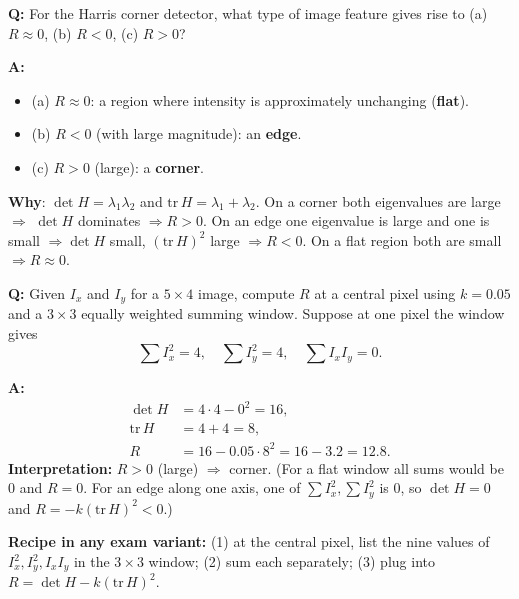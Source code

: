 \begin{exbox}
\textbf{Q:} For the Harris corner detector, what type of image feature gives rise to (a) $R \approx 0$, (b) $R < 0$, (c) $R > 0$?

\textbf{A:}
\begin{itemize}
  \item (a) $R \approx 0$: a region where intensity is approximately unchanging (\textbf{flat}).
  \item (b) $R < 0$ (with large magnitude): an \textbf{edge}.
  \item (c) $R > 0$ (large): a \textbf{corner}.
\end{itemize}
\textbf{Why}: $\det H = \lambda_1 \lambda_2$ and $\mathrm{tr}\, H = \lambda_1 + \lambda_2$. On a corner both eigenvalues are large $\Rightarrow$ $\det H$ dominates $\Rightarrow R > 0$. On an edge one eigenvalue is large and one is small $\Rightarrow \det H$ small, $(\mathrm{tr}\, H)^2$ large $\Rightarrow R < 0$. On a flat region both are small $\Rightarrow R \approx 0$.
\end{exbox}

\begin{exbox}
\textbf{Q:} Given $I_x$ and $I_y$ for a $5\times 4$ image, compute $R$ at a central pixel using $k=0.05$ and a $3\times 3$ equally weighted summing window. Suppose at one pixel the window gives
\[
\sum I_x^2 = 4, \quad \sum I_y^2 = 4, \quad \sum I_x I_y = 0.
\]

\textbf{A:}
\begin{align*}
\det H &= 4\cdot 4 - 0^2 = 16, \\
\mathrm{tr}\, H &= 4 + 4 = 8, \\
R &= 16 - 0.05 \cdot 8^2 = 16 - 3.2 = 12.8.
\end{align*}
\textbf{Interpretation:} $R > 0$ (large) $\Rightarrow$ corner. (For a flat window all sums would be 0 and $R = 0$. For an edge along one axis, one of $\sum I_x^2, \sum I_y^2$ is 0, so $\det H = 0$ and $R = -k(\mathrm{tr}\, H)^2 < 0$.)

\textbf{Recipe in any exam variant:}
(1) at the central pixel, list the nine values of $I_x^2, I_y^2, I_x I_y$ in the $3\times 3$ window;
(2) sum each separately;
(3) plug into $R = \det H - k(\mathrm{tr}\, H)^2$.
\end{exbox}


